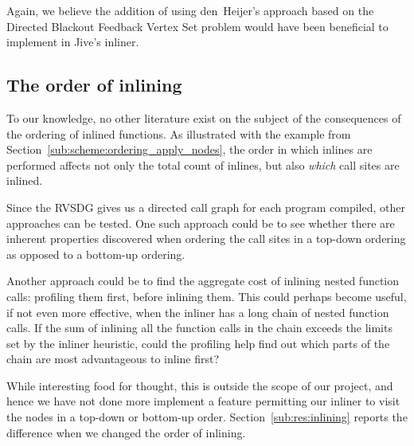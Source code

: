 Again, we believe the addition of using den~Heijer's approach based on the
Directed Blackout Feedback Vertex Set problem would have been beneficial to
implement in Jive's inliner.

\subsection{The order of inlining}
\label{sub:fw:call_site_visit_order}

To our knowledge, no other literature exist on the subject of the consequences
of the ordering of inlined functions. As illustrated with the example from
Section~\ref{sub:scheme:ordering_apply_nodes}, the order in which inlines are
performed affects not only the total count of inlines, but also \textit{which}
call sites are inlined.

Since the RVSDG gives us a directed call graph for each program compiled, other
approaches can be tested. One such approach could be to see whether there are
inherent properties discovered when ordering the call sites in a top-down
ordering as opposed to a bottom-up ordering.

Another approach could be to find the aggregate cost of inlining nested function
calls: profiling them first, before inlining them. This could perhaps become
useful, if not even more effective, when the inliner has a long chain of nested
function calls. If the sum of inlining all the function calls in the chain
exceeds the limits set by the inliner heuristic, could the profiling help find
out which parts of the chain are most advantageous to inline first?

While interesting food for thought, this is outside the scope of our project,
and hence we have not done more implement a feature permitting our inliner to
visit the nodes in a top-down or bottom-up order. Section~\ref{sub:res:inlining}
reports the difference when we changed the order of inlining.
